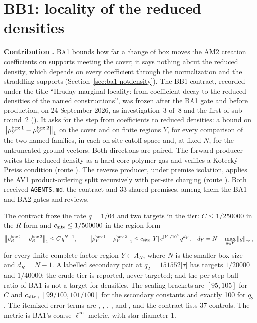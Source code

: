 \section{BB1: locality of the reduced densities}
\label{sec:bb1}

\textbf{Contribution .} BA1 bounds how far a change of
box moves the AM2 creation coefficients on supports meeting the cover; it says
nothing about the reduced density, which depends on every coefficient through
the normalization and the straddling supports (Section~\ref{sec:ba1-notdensity}).
The BB1 contract, recorded under the title ``Hruday marginal locality: from
coefficient decay to the reduced densities of the named constructions'', was
frozen after the BA1 gate and before production, on 24 September 2026, as
investigation~3 of~8 and the first of sub-round~2
(). It asks
for the step from coefficients to reduced densities: a bound on
$\left\lVert\rho^{\rm box\,1}_Y-\rho^{\rm box\,2}_Y\right\rVert_1$ on the cover and on finite
regions $Y$, for every comparison of the two named families, in each on-site
cutoff space and, at fixed $N$, for the untruncated ground vectors. Both
directions are paired. The forward producer writes the reduced density as a
hard-core polymer gas and verifies a Kotecký--Preiss condition (route
). The reverse producer, under premise isolation, applies
the AV1 product-ordering split recursively with per-site charging (route
). Both received \texttt{AGENTS.md}, the contract and 33
shared premises, among them the BA1 and BA2 gates and reviews.

The contract froze the rate $q=1/64$ and two targets in the
 tier: $C\le1/250000$ in the $R$ form and
$c_{\rm site}\le1/500000$ in the region form
\begin{equation}
 \left\lVert\rho^{\rm box\,1}_R-\rho^{\rm box\,2}_R\right\rVert_1\le C\,q^{N-1},\qquad
 \left\lVert\rho^{\rm box\,1}_Y-\rho^{\rm box\,2}_Y\right\rVert_1\le c_{\rm site}\,|Y|\,e^{|Y|/10^8}\,q^{d_Y},\quad
 d_Y=N-\max_{y\in Y}\left\lVert y\right\rVert_\infty ,
 \label{eq:bb1-forms}
\end{equation}
for every finite complete-factor region $Y\subset\Lambda_N$, where $N$ is the
smaller box size and $d_R=N-1$. A labelled secondary pair at
$q_2=151552|\tau|$ has targets $1/20000$ and $1/40000$; the crude tier is
reported, never targeted; and the per-step ball ratio of BA1 is not a target
for densities. The scaling brackets are $[95,105]$ for $C$ and $c_{\rm site}$,
$[99/100,101/100]$ for the secondary constants and exactly 100 for $q_2$. The
itemized error terms are ,
, ,
,  and
, and the contract lists 37 controls. The metric is BA1's
coarse $\ell^\infty$ metric, with star diameter 1.

